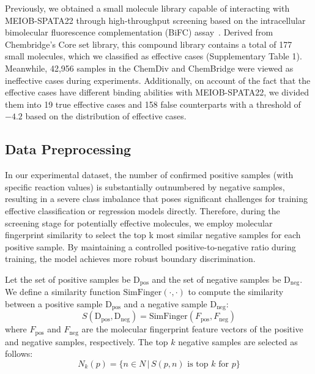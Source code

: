\documentclass[unnumsec,webpdf,contemporary,large]{oup-authoring-template}%
\theoremstyle{thmstyleone}%
\theoremstyle{thmstyletwo}%
\theoremstyle{thmstylethree}%
\begin{document}
Previously, we obtained a small molecule library capable of interacting with MEIOB-SPATA22 through high-throughput screening based on the intracellular bimolecular fluorescence complementation (BiFC) assay~\cite{67}. Derived from Chembridge's Core set library, this compound library contains a total of 177 small molecules, which we classified as effective cases (Supplementary Table 1). Meanwhile, 42,956 samples in the ChemDiv and ChemBridge were viewed as ineffective cases during experiments. Additionally, on account of the fact that the effective cases have different binding abilities with MEIOB-SPATA22, we divided them into 19 true effective cases and 158 false counterparts with a threshold of $-4.2$ based on the distribution of effective cases.


\subsection*{Data Preprocessing}

In our experimental dataset, the number of confirmed positive samples (with specific reaction values) is substantially outnumbered by negative samples, resulting in a severe class imbalance that poses significant challenges for training effective classification or regression models directly. Therefore, during the screening stage for potentially effective molecules, we employ molecular fingerprint similarity to select the top k most similar negative samples for each positive sample. By maintaining a controlled positive-to-negative ratio during training, the model achieves more robust boundary discrimination.

Let the set of positive samples be $\text{D}_{\text{pos}}$ and the set of negative samples be $\text{D}_{\text{neg}}$. We define a similarity function $\text{SimFinger}(\cdot,\cdot)$ to compute the similarity between a positive sample $\text{D}_{\text{pos}}$ and a negative sample $\text{D}_{\text{neg}}$:
\begin{equation}
S(\text{D}_{\text{pos}}, \text{D}_{\text{neg}}) = \text{SimFinger}(F_{\text{pos}}, F_{\text{neg}})
\end{equation}
where $F_{\text{pos}}$ and $F_{\text{neg}}$ are the molecular fingerprint feature vectors of the positive and negative samples, respectively. The top $k$ negative samples are selected as follows:
\begin{equation}
N_k(p) = \{n \in N \,|\, S(p, n) \text{ is top } k \text{ for } p\}
\end{equation}
\end{document}
